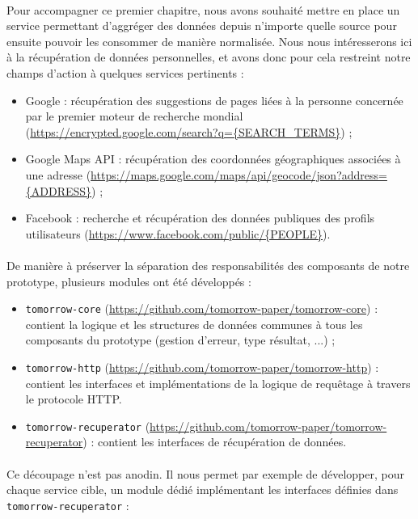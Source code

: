 \paragraph{} Pour accompagner ce premier chapitre, nous avons souhaité mettre en place un service permettant d'aggréger
des données depuis n'importe quelle source pour ensuite pouvoir les consommer de manière normalisée.
Nous nous intéresserons ici à la récupération de données personnelles, et avons donc pour cela restreint notre champs
d'action à quelques services pertinents :

\begin{itemize}
    \item Google : récupération des suggestions de pages liées à la personne concernée par le
    premier moteur de recherche mondial (\url{https://encrypted.google.com/search?q={SEARCH_TERMS}}) ;
    \item Google Maps API : récupération des coordonnées géographiques associées à une adresse
    (\url{https://maps.google.com/maps/api/geocode/json?address={ADDRESS}}) ;
    \item Facebook : recherche et récupération des données publiques des profils utilisateurs
    (\url{https://www.facebook.com/public/{PEOPLE}}).
\end{itemize}

\paragraph{} De manière à préserver la séparation des responsabilités des composants de notre prototype, plusieurs modules
ont été développés : 

\begin{itemize}
    \item \lstinline{tomorrow-core} (\url{https://github.com/tomorrow-paper/tomorrow-core}) : contient la logique et les
    structures de données communes à tous les composants du prototype (gestion d'erreur, type résultat, ...) ;
    \item \lstinline{tomorrow-http} (\url{https://github.com/tomorrow-paper/tomorrow-http}) : contient les interfaces et
    implémentations de la logique de requêtage à travers le protocole HTTP.
    \item \lstinline{tomorrow-recuperator} (\url{https://github.com/tomorrow-paper/tomorrow-recuperator}) : contient les interfaces
    de récupération de données.
\end{itemize}

\paragraph{} Ce découpage n'est pas anodin. Il nous permet par exemple de développer, pour chaque service cible, un module
dédié implémentant les interfaces définies dans \lstinline{tomorrow-recuperator}  :

